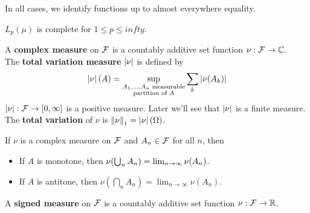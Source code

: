 \documentclass{article}
\begin{document}
In all cases, we identify functions up to almost everywhere equality.

\begin{thm}
  $L_p(\mu)$ is complete for $1 \le p \le infty$.
\end{thm}

\begin{dfn*}
  A {\bf complex measure} on $\mathcal F$ is a countably additive set function $\nu : \mathcal F \to \mathbb C$. \\
  The {\bf total variation measure} $\left\lvert \nu\right\rvert$ is defined by
  $$\left\lvert \nu\right\rvert(A) = \sup_{\substack{A_1, \dots, A_n \text{ measurable} \\ \text{partition of } A}} \sum_k \left\lvert \nu(A_k)\right\rvert$$
  $\left\lvert \nu\right\rvert : \mathcal F \to [0, \infty]$ is a positive measure. Later we'll see that $\left\lvert \nu\right\rvert$ is a finite measure. \\
  The {\bf total variation} of $\nu$ is $\left\lVert \nu\right\rVert_1 = \left\lvert \nu\right\rvert(\Omega)$.
\end{dfn*}

\begin{prop}
  If $\nu$ is a complex measure on $\mathcal F$ and $A_n \in \mathcal F$ for all $n$, then
  \begin{itemize}
    \item If $A$ is monotone, then $\nu(\bigcup_n A_n) = \lim_{n \to \infty} \nu(A_n)$.
    \item If $A$ is antitone, then $\nu(\bigcap_n A_n) = \lim_{n \to \infty} \nu(A_n)$.
  \end{itemize}
\end{prop}

\begin{dfn*}
  A {\bf signed measure} on $\mathcal F$ is a countably additive set function $\nu : \mathcal F \to \mathbb R$.
\end{dfn*}
\end{document}
